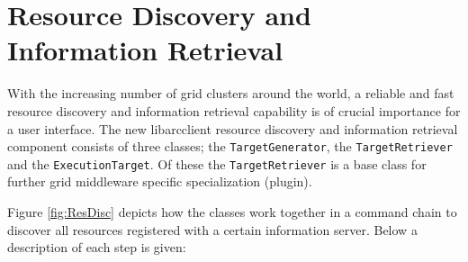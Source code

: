 \documentclass{book}
\newcommand{\arclib}{libarcclient}
\newcommand{\ExecutionTarget}{\texttt{ExecutionTarget}}
\newcommand{\TargetGenerator}{\texttt{TargetGenerator}}
\newcommand{\TargetRetriever}{\texttt{TargetRetriever}}
\begin{document}
\section{Resource Discovery and Information Retrieval}
\label{sec:TargetDiscovery}

With the increasing number of grid clusters around the world, a
reliable and fast resource discovery and information retrieval
capability is of crucial importance for a user interface. The new
{\arclib} resource discovery and information retrieval component
consists of three classes; the {\TargetGenerator}, the
{\TargetRetriever} and the {\ExecutionTarget}. Of these the
{\TargetRetriever} is a base class for further grid middleware
specific specialization (plugin).

Figure \ref{fig:ResDisc} depicts how the classes work together in a
command chain to discover all resources registered with a certain
information server. Below a description of each step is given:

\begin{figure}[ht]
\end{figure}
\end{document}
